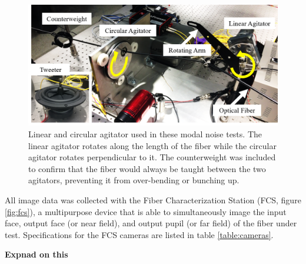 \documentclass[twocolumn]{emulateapj}
\begin{document}
\begin{figure}
\centering
	\includegraphics[width=\columnwidth]{images/agitators_labelled.png}
	\caption{Linear and circular agitator used in these modal noise tests. The linear agitator rotates along the length of the fiber while the circular agitator rotates perpendicular to it. The counterweight was included to confirm that the fiber would always be taught between the two agitators, preventing it from over-bending or bunching up.}
\label{fig:agitators}
\end{figure} 

All image data was collected with the Fiber Characterization Station (FCS, figure \ref{fig:fcs}), a multipurpose device that is able to simultaneously image the input face, output face (or near field), and output pupil (or far field) of the fiber under test. Specifications for the FCS cameras are listed in table \ref{table:cameras}.

\textbf{Expnad on this}
\end{document}
